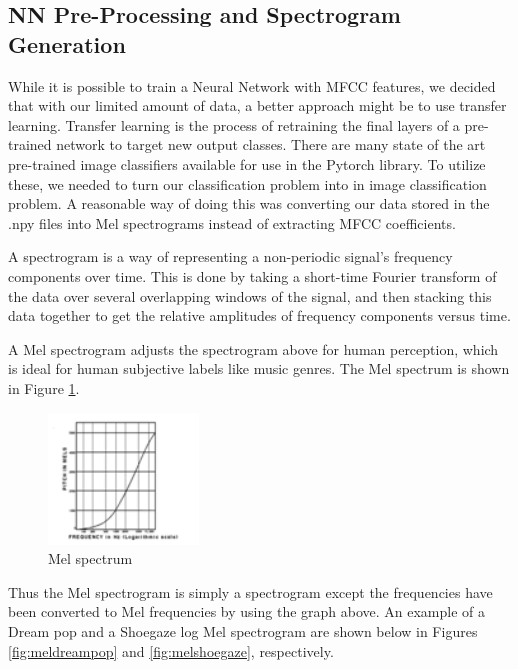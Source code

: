 \documentclass[letterpaper, 12 pt, conference]{ieeeconf}  %
\begin{document}

\subsection{NN Pre-Processing and Spectrogram Generation}

While it is possible to train a Neural Network with MFCC features, we decided that with our limited amount of data, a better approach might be to use transfer learning. Transfer learning is the process of retraining the final layers of a pre-trained network to target new output classes. There are many state of the art pre-trained image classifiers available for use in the Pytorch library. To utilize these, we needed to turn our classification problem into in image classification problem. A reasonable way of doing this was converting our data stored in the .npy files into Mel spectrograms instead of extracting MFCC coefficients.

A spectrogram is a way of representing a non-periodic signal’s frequency components over time. This is done by taking a short-time Fourier transform of the data over several overlapping windows of the signal, and then stacking this data together to get the relative amplitudes of frequency components versus time. 

A Mel spectrogram adjusts the spectrogram above for human perception, which is ideal for human subjective labels like music genres. The Mel spectrum is shown in Figure \ref{fig:melspectrum}.

\begin{figure}[!hb]
\begin{center}
    \includegraphics[width=4cm]{melspectrum.png}
\caption{Mel spectrum}
\label{fig:melspectrum}
\end{center}

\end{figure}


Thus the Mel spectrogram is simply a spectrogram except the frequencies have been converted to Mel frequencies by using the graph above. An example of a Dream pop and a Shoegaze log Mel spectrogram are shown below in Figures \ref{fig:meldreampop} and \ref{fig:melshoegaze}, respectively.
\end{document}
